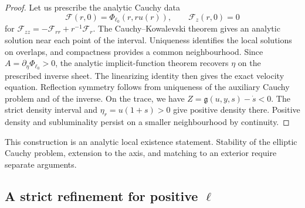 \documentclass[11pt,a4paper]{article}
\numberwithin{equation}{section}
\theoremstyle{plain}
\theoremstyle{definition}
\theoremstyle{remark}
\newcommand{\ellzero}{\ell_0}
\begin{document}
\begin{proof}
Let us prescribe the analytic Cauchy data
\begin{equation}
\mathcal F(r,0)=\Phi_{\ellzero}(r,ru(r)),\qquad
\mathcal F_z(r,0)=0
\end{equation}
for $\mathcal F_{zz}=-\mathcal F_{rr}+r^{-1}\mathcal F_r$. The Cauchy--Kowalevski theorem gives an analytic solution near each point of the interval. Uniqueness identifies the local solutions on overlaps, and compactness provides a common neighbourhood. Since $A=\partial_\eta\Phi_{\ellzero}>0$, the analytic implicit-function theorem recovers $\eta$ on the prescribed inverse sheet. The linearizing identity then gives the exact velocity equation. Reflection symmetry follows from uniqueness of the auxiliary Cauchy problem and of the inverse. On the trace, we have $Z=\mathfrak g(u,y,s)-\dot s<0$. The strict density interval and $\eta_r=u(1+s)>0$ give positive density there. Positive density and subluminality persist on a smaller neighbourhood by continuity.
\end{proof}
This construction is an analytic local existence statement. Stability of the elliptic Cauchy problem, extension to the axis, and matching to an exterior require separate arguments.

\subsection{A strict refinement for positive \texorpdfstring{$\ell$}{ell}}
\end{document}
